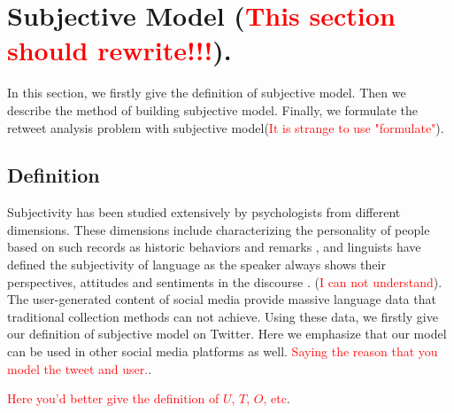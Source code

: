 \documentclass{acm_proc_article-sp}
\newcommand{\mo}[1]{\textcolor{red}{#1}}
\begin{document}
\section{Subjective Model (\mo{This section should rewrite!!!}).}
\label{subjectivemodel}
In this section, we firstly give the definition of subjective model. Then we describe the method of building subjective model. Finally, we formulate the retweet analysis problem with subjective model(\mo{It is strange to use "formulate"}).
\subsection{Definition}
\label{definition}

Subjectivity has been studied extensively by psychologists from different dimensions. These  dimensions include characterizing the personality of people based on such records as historic behaviors and remarks \cite{Engbert2007}, and linguists have defined the subjectivity of language as the speaker always shows their perspectives, attitudes and sentiments in the discourse \cite{stein2005subjectivity}.  (\mo{I can not understand}). 
The user-generated content of social media provide massive language data that traditional collection methods can not achieve.
Using these data, we firstly give our definition of subjective model on Twitter. Here we emphasize that our model can be used in other social media platforms as well. \mo{Saying the reason that you model the tweet and user.}. 

\mo{Here you'd better give the definition of $U$, $T$, $O$, etc}. 
\end{document}
